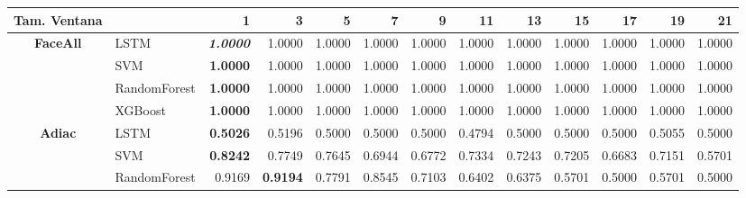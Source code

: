 \newpage
\begin{table}[H]
	\centering
	\begin{adjustbox}{max width=12cm}
		\begin{tabular}{|c|l|r|r|r|r|r|r|r|r|r|r|r|}
			\hline
			\textbf{Tam. Ventana} &              & 1                        & 3               & 5               & 7               & 9                        & 11              & 13     & 15     & 17              & 19                       & 21                       \\
			\hline
			\textbf{FaceAll}      & LSTM         & \textit{\textbf{1.0000}} & 1.0000          & 1.0000          & 1.0000          & 1.0000                   & 1.0000          & 1.0000 & 1.0000 & 1.0000          & 1.0000                   & 1.0000                   \\
			                      & SVM          & \textbf{1.0000}          & 1.0000          & 1.0000          & 1.0000          & 1.0000                   & 1.0000          & 1.0000 & 1.0000 & 1.0000          & 1.0000                   & 1.0000                   \\
			                      & RandomForest & \textbf{1.0000}          & 1.0000          & 1.0000          & 1.0000          & 1.0000                   & 1.0000          & 1.0000 & 1.0000 & 1.0000          & 1.0000                   & 1.0000                   \\
			                      & XGBoost      & \textbf{1.0000}          & 1.0000          & 1.0000          & 1.0000          & 1.0000                   & 1.0000          & 1.0000 & 1.0000 & 1.0000          & 1.0000                   & 1.0000                   \\
			\hline
			\textbf{Adiac}        & LSTM         & \textbf{0.5026}          & 0.5196          & 0.5000          & 0.5000          & 0.5000                   & 0.4794          & 0.5000 & 0.5000 & 0.5000          & 0.5055                   & 0.5000                   \\
			                      & SVM          & \textbf{0.8242}          & 0.7749          & 0.7645          & 0.6944          & 0.6772                   & 0.7334          & 0.7243 & 0.7205 & 0.6683          & 0.7151                   & 0.5701                   \\
			                      & RandomForest & 0.9169                   & \textbf{0.9194} & 0.7791          & 0.8545          & 0.7103                   & 0.6402          & 0.6375 & 0.5701 & 0.5000          & 0.5701                   & 0.5000                   \\

\end{tabular}
\end{adjustbox}
\end{table}
